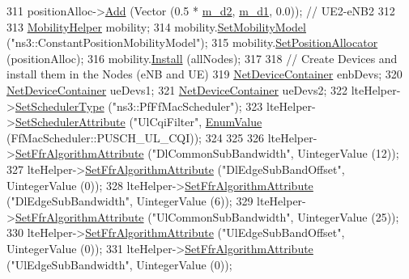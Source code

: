 \begin{DoxyCode}
311   positionAlloc->\hyperlink{classns3_1_1ListPositionAllocator_a460e82f015ac012a73ba0ea0cccb3486}{Add} (Vector (0.5 * \hyperlink{classLteInterferenceStrictFrTestCase_abbc5236155c073bca8f45049c2d2d9df}{m\_d2}, \hyperlink{classLteInterferenceStrictFrTestCase_a0ad0c27ec563dbace40fe0deb0f104e0}{m\_d1}, 0.0));    \textcolor{comment}{// UE2-eNB2}
312 
313   \hyperlink{classns3_1_1MobilityHelper}{MobilityHelper} mobility;
314   mobility.\hyperlink{classns3_1_1MobilityHelper_a030275011b6f40682e70534d30280aba}{SetMobilityModel} (\textcolor{stringliteral}{"ns3::ConstantPositionMobilityModel"});
315   mobility.\hyperlink{classns3_1_1MobilityHelper_ac59d5295076be3cc11021566713a28c5}{SetPositionAllocator} (positionAlloc);
316   mobility.\hyperlink{classns3_1_1MobilityHelper_a07737960ee95c0777109cf2994dd97ae}{Install} (allNodes);
317 
318   \textcolor{comment}{// Create Devices and install them in the Nodes (eNB and UE)}
319   \hyperlink{classns3_1_1NetDeviceContainer}{NetDeviceContainer} enbDevs;
320   \hyperlink{classns3_1_1NetDeviceContainer}{NetDeviceContainer} ueDevs1;
321   \hyperlink{classns3_1_1NetDeviceContainer}{NetDeviceContainer} ueDevs2;
322   lteHelper->\hyperlink{classns3_1_1LteHelper_a8f86e55b8b80a81732c4b2df00fb25d5}{SetSchedulerType} (\textcolor{stringliteral}{"ns3::PfFfMacScheduler"});
323   lteHelper->\hyperlink{classns3_1_1LteHelper_a38f8c7f4592b31c0f3dedb53e7909742}{SetSchedulerAttribute} (\textcolor{stringliteral}{"UlCqiFilter"}, 
      \hyperlink{classns3_1_1EnumValue}{EnumValue} (FfMacScheduler::PUSCH\_UL\_CQI));
324 
325 
326   lteHelper->\hyperlink{classns3_1_1LteHelper_a793d56e843a844428851e90752c5f130}{SetFfrAlgorithmAttribute} (\textcolor{stringliteral}{"DlCommonSubBandwidth"}, UintegerValue (12));
327   lteHelper->\hyperlink{classns3_1_1LteHelper_a793d56e843a844428851e90752c5f130}{SetFfrAlgorithmAttribute} (\textcolor{stringliteral}{"DlEdgeSubBandOffset"}, UintegerValue (0));
328   lteHelper->\hyperlink{classns3_1_1LteHelper_a793d56e843a844428851e90752c5f130}{SetFfrAlgorithmAttribute} (\textcolor{stringliteral}{"DlEdgeSubBandwidth"}, UintegerValue (6));
329   lteHelper->\hyperlink{classns3_1_1LteHelper_a793d56e843a844428851e90752c5f130}{SetFfrAlgorithmAttribute} (\textcolor{stringliteral}{"UlCommonSubBandwidth"}, UintegerValue (25));
330   lteHelper->\hyperlink{classns3_1_1LteHelper_a793d56e843a844428851e90752c5f130}{SetFfrAlgorithmAttribute} (\textcolor{stringliteral}{"UlEdgeSubBandOffset"}, UintegerValue (0));
331   lteHelper->\hyperlink{classns3_1_1LteHelper_a793d56e843a844428851e90752c5f130}{SetFfrAlgorithmAttribute} (\textcolor{stringliteral}{"UlEdgeSubBandwidth"}, UintegerValue (0));

\end{DoxyCode}
